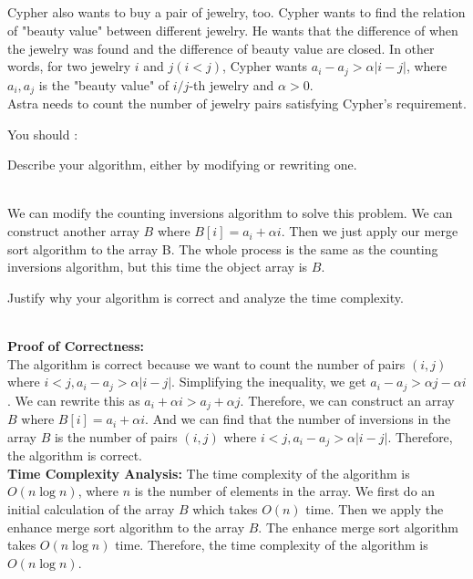 \begin{parts}
\newpage
\part{} Cypher also wants to buy a pair of jewelry, too. Cypher wants to find the relation of "beauty value" between different jewelry. He wants that the difference of when the jewelry was found and the difference of beauty value are closed. In other words, for two jewelry $i$ and $j(i<j)$, Cypher wants $a_i- a_j>\alpha|i-j|$, where $a_i,a_j$ is the "beauty value" of $i/j$-th jewelry and $\alpha>0$.\\
Astra needs to count the number of jewelry pairs satisfying Cypher's requirement.

You should :
\begin{subparts}
  \subpart[4]Describe your algorithm, either by modifying or rewriting one.
    \begin{solution}
        \\
        We can modify the counting inversions algorithm to solve this problem. We can construct another array $B$ where $B[i] = a_i + \alpha i$. Then we just apply our merge sort algorithm to the array B. The whole process is the same as the counting inversions algorithm, but this time the object array is $B$.
    \end{solution}
    \subpart[2] Justify why your algorithm is correct and analyze the time complexity. 
    \begin{solution} 
        \\
        \textbf{Proof of Correctness:}\\
        The algorithm is correct because we want to count the number of pairs $(i,j)$ where $ i < j, a_i - a_j > \alpha|i-j|$. Simplifying the inequality, we get $a_i - a_j > \alpha j - \alpha i$. We can rewrite this as $a_i + \alpha i > a_j + \alpha j$. Therefore, we can construct an array $B$ where $B[i] = a_i + \alpha i$. And we can find that the number of inversions in the array $B$ is the number of pairs $(i,j)$ where $ i < j, a_i - a_j > \alpha|i-j|$. Therefore, the algorithm is correct.
        \\
        \textbf{Time Complexity Analysis:}
        The time complexity of the algorithm is $O(n\log n)$, where $n$ is the number of elements in the array. We first do an initial calculation of the array $B$ which takes $O(n)$ time. Then we apply the enhance merge sort algorithm to the array $B$. The enhance merge sort algorithm takes $O(n\log n)$ time. Therefore, the time complexity of the algorithm is $O(n\log n)$.
    \end{solution}
\end{subparts}
\end{parts}